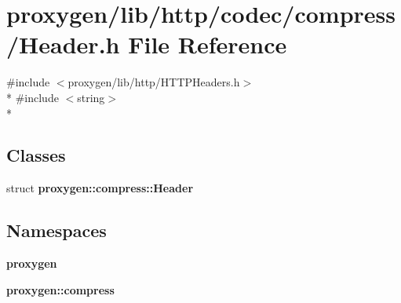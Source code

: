 \section{proxygen/lib/http/codec/compress/\+Header.h File Reference}
\label{Header_8h}
{\ttfamily \#include $<$proxygen/lib/http/\+H\+T\+T\+P\+Headers.\+h$>$}\\*
{\ttfamily \#include $<$string$>$}\\*
\subsection*{Classes}
\begin{DoxyCompactItemize}
\item 
struct {\bf proxygen\+::compress\+::\+Header}
\end{DoxyCompactItemize}
\subsection*{Namespaces}
\begin{DoxyCompactItemize}
\item 
 {\bf proxygen}
\item 
 {\bf proxygen\+::compress}
\end{DoxyCompactItemize}
